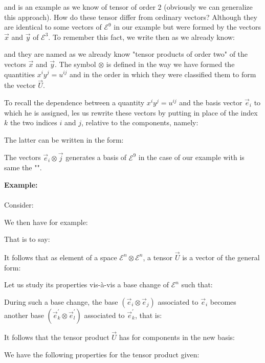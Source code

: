 	and is an example as we know of tensor of order $2$ (obviously we can generalize this approach).
	How do these tensor differ from ordinary vectors? Although they are identical to some vectors of $\mathcal{E}^9$ in our example but were formed by the vectors $\vec{x}$ and $\vec{y}$ of $\mathcal{E}^3$. To remember this fact, we write then as we already know:
	
	and they are named as we already know "tensor products of order two" of the vectors $\vec{x}$ and $\vec{y}$. The symbol $\otimes$ is defined in the way we have formed the quantities $x^iy^j=u^{ij}$ and in the order in which they were classified them to form the vector $\vec{U}$.

	To recall the dependence between a quantity $x^iy^j=u^{ij}$ and the basis vector $\vec{e}_i$ to which he is assigned, les us rewrite these vectors by putting in place of the index $k$ the two indices $i$ and $j$, relative to the components, namely:
	
	The latter can be written in the form:
	
	The vectors $\vec{e}_i\otimes\vec{j}$ generates a basis of $\mathcal{E}^9$ in the case of our example with is same the "".
	\begin{tcolorbox}[colframe=black,colback=white,sharp corners]
	\textbf{{\Large {}}Example:}\\\\
	Consider:
	
	We then have for example:
	
	That is to say:
	
	\end{tcolorbox}
	It follows that as element of a space $\mathcal{E}^n\otimes \mathcal{E}^n$, a tensor $\vec{U}$ is a vector of the general form:
	
	Let us study its properties vis-à-vis a base change of $\mathcal{E}^n$ such that:
	
	During such a base change, the base $(\vec{e}_i\otimes\vec{e}_j)$ associated to $\vec{e}_i$  becomes another base $(\vec{e}_k^{\prime}\otimes\vec{e}_l^{\prime})$ associated to $\vec{e}_k^{\prime}$, that is:
	
	It follows that the tensor product $\vec{U}$ has for components in the new basis:
	
	We have the following properties for the tensor product given:
	
